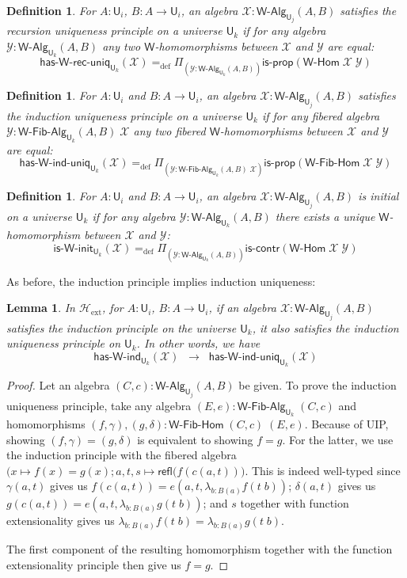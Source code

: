 \documentclass[reqno,10pt,a4paper,oneside]{amsart}
\newcommand{\X}{\mathcal{X}}
\newcommand{\Y}{\mathcal{Y}}
\newcommand{\prd}[1]{\Pi_{#1}}
\newcommand{\lam}[1]{\lambda_{#1}}
\newcommand{\defeq}{=_{\mathrm{def}}}
\newcommand{\refl}{\mathsf{refl}}
\newcommand{\W}{\mathsf{W}}
\newcommand{\UU}{\mathsf{U}}
\newcommand{\WAlg}{\mathsf{W}\text{-}\mathsf{Alg}}
\newcommand{\WFibAlg}{\mathsf{W}\text{-}\mathsf{Fib}\text{-}\mathsf{Alg}}
\newcommand{\WHom}{\mathsf{W}\text{-}\mathsf{Hom}}
\newcommand{\WFibHom}{\mathsf{W}\text{-}\mathsf{Fib}\text{-}\mathsf{Hom}}
\newcommand{\HasWInd}{\mathsf{has}\text{-}\mathsf{W}\text{-}\mathsf{ind}}
\newcommand{\HasWRecUniq}{\mathsf{has}\text{-}\mathsf{W}\text{-}\mathsf{rec}\text{-}\mathsf{uniq}}
\newcommand{\HasWIndUniq}{\mathsf{has}\text{-}\mathsf{W}\text{-}\mathsf{ind}\text{-}\mathsf{uniq}}
\newcommand{\IsWInit}{\mathsf{is}\text{-}\mathsf{\W}\text{-}\mathsf{init}}
\newcommand{\iscontr}{\mathsf{is}\text{-}\mathsf{contr}}
\newcommand{\isprop}{\mathsf{is}\text{-}\mathsf{prop}}
\newcommand{\Hext}{\mathcal{H}_{\mathrm{ext}}}
\numberwithin{equation}{section}
\theoremstyle{mythm}
\newtheorem{lemma}[theorem]{Lemma}
\theoremstyle{mydef}
\newtheorem{definition}[theorem]{Definition}
\theoremstyle{myrmk}
\begin{document}
\begin{definition}\label{def:WRecUniq}
For $A:\UU_i$, $B : A \to \UU_i$, an algebra $\X : \WAlg_{\UU_j}(A,B)$ \emph{satisfies the recursion uniqueness principle} on a universe $\UU_k$ if for any algebra $\Y : \WAlg_{\UU_k}(A,B)$
any two $\W$-homomorphisms between $\X$ and $\Y$ are equal:
\[ \HasWRecUniq_{\UU_k}(\X) \defeq \prd{(\Y:\WAlg_{\UU_k}(A,B))} \isprop(\WHom \; \X \; \Y) \]
\end{definition}

\begin{definition}\label{def:WIndUniq}
For $A:\UU_i$ and $B : A \to \UU_i$, an algebra $\X : \WAlg_{\UU_j}(A,B)$ \emph{satisfies the induction uniqueness principle} on a universe $\UU_k$ if for any fibered algebra $\Y : \WFibAlg_{\UU_k}(A,B) \; \X$ any two fibered $\W$-homomorphisms between $\X$ and $\Y$ are equal:
\[ \HasWIndUniq_{\UU_k}(\X) \defeq \prd{(\Y:\WFibAlg_{\UU_k}(A,B) \; \X)} \isprop(\WFibHom \; \X \; \Y) \]
\end{definition}

\begin{definition}\label{def:WInit}
For $A:\UU_i$ and $B : A \to \UU_i$, an algebra $\X : \WAlg_{\UU_j}(A,B)$ is \emph{initial} on a universe $\UU_k$ if for any algebra $\Y : \WAlg_{\UU_k}(A,B)$ there exists a unique $\W$-homomorphism between $\X$ and $\Y$:
\[ \IsWInit_{\UU_k}(\X) \defeq \prd{(\Y:\WAlg_{\UU_k}(A,B))} \iscontr(\WHom \; \X \; \Y) \]  
\end{definition}

As before, the induction principle implies induction uniqueness:

\begin{lemma}\label{lem:WIndImpUniq}
In $\Hext$, for $A:\UU_i$, $B : A \to \UU_i$, if an algebra $\X : \WAlg_{\UU_j}(A,B)$ satisfies the induction principle on the universe $\UU_k$, it also satisfies the induction uniqueness principle on $\UU_k$. In other words, we have
\[ \HasWInd_{\UU_k}(\X) \;\; \rightarrow \;\; \HasWIndUniq_{\UU_k}(\X) \]
\end{lemma}
\begin{proof}
Let an algebra $(C,c) : \WAlg_{\UU_j}(A,B)$ be given. To prove the induction uniqueness principle, take any algebra $(E,e) : \WFibAlg_{\UU_k} \; (C,c)$ and homomorphisms $(f,\gamma), (g,\delta) : \WFibHom \; (C,c) \; (E,e)$. Because of UIP, showing $(f,\gamma) = (g,\delta)$ is equivalent to showing $f = g$. For the latter, we use the induction principle with the fibered algebra $\big(x \mapsto f(x) = g(x); a,t,s \mapsto \refl(f(c(a,t)) \big)$. This is indeed well-typed since $\gamma(a,t)$ gives us $f(c(a,t)) = e(a,t,\lam{b:B(a)} f(t\;b))$; $\delta(a,t)$ gives us $g(c(a,t)) = e(a,t,\lam{b:B(a)} g(t\;b))$; and $s$ together with function extensionality gives us
$\lam{b:B(a)} f(t\;b) = \lam{b:B(a)} g(t\;b)$.

The first component of the resulting homomorphism together with the function extensionality principle then give us $f = g$.
\end{proof}
\end{document}
